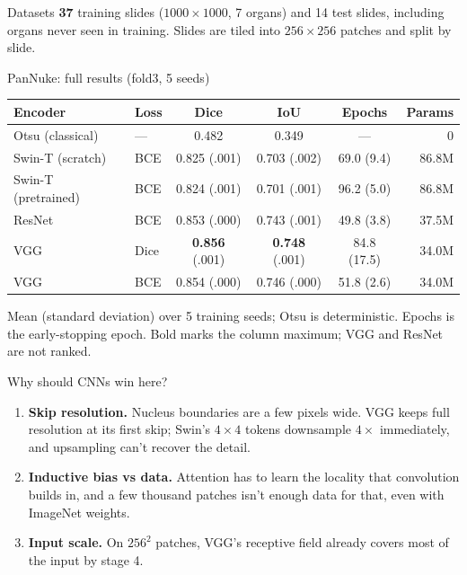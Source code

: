\documentclass[final]{beamer}
\newlength{\colwidth}
\begin{document}
\begin{frame}[t]
\begin{columns}[t]
\begin{column}{\colwidth}
\begin{block}{Datasets}
    \textbf{37} training slides ($1000\times1000$, 7 organs) and 14 test slides,
    including organs never seen in training. Slides are tiled into $256\times256$
    patches and split by slide.
  \end{block}

  \begin{block}{PanNuke: full results (fold3, 5 seeds)}
    \begin{center}
    \begin{tabular}{@{}llcccr@{}}
      \toprule
      \textbf{Encoder} & \textbf{Loss} & \textbf{Dice} & \textbf{IoU} & \textbf{Epochs} & \textbf{Params} \\
      \midrule
      Otsu (classical) & --- & 0.482 & 0.349 & --- & 0 \\
      \midrule
      Swin-T (scratch) & BCE & 0.825 {\small(.001)} & 0.703 {\small(.002)} & 69.0 {\small(9.4)} & 86.8M \\
      Swin-T (pretrained) & BCE & 0.824 {\small(.001)} & 0.701 {\small(.001)} & 96.2 {\small(5.0)} & 86.8M \\
      ResNet & BCE & 0.853 {\small(.000)} & 0.743 {\small(.001)} & 49.8 {\small(3.8)} & 37.5M \\
      VGG & Dice & \textbf{0.856} {\small(.001)} & \textbf{0.748} {\small(.001)} & 84.8 {\small(17.5)} & 34.0M \\
      VGG & BCE & 0.854 {\small(.000)} & 0.746 {\small(.000)} & 51.8 {\small(2.6)} & 34.0M \\
      \bottomrule
    \end{tabular}
    \end{center}
    Mean (standard deviation) over 5 training seeds; Otsu is deterministic. Epochs is the
    early-stopping epoch. Bold marks the column maximum; VGG and ResNet are not ranked.
  \end{block}

  \begin{block}{Why should CNNs win here?}
    \begin{enumerate}
      \item \textbf{Skip resolution.} Nucleus boundaries are a few pixels wide. VGG keeps
        full resolution at its first skip; Swin's $4\times4$ tokens downsample $4\times$
        immediately, and upsampling can't recover the detail.
      \item \textbf{Inductive bias vs data.} Attention has to learn the locality that
        convolution builds in, and a few thousand patches isn't enough data for that,
        even with ImageNet weights.
      \item \textbf{Input scale.} On $256^2$ patches, VGG's receptive field already
        covers most of the input by stage 4.
    \end{enumerate}
  \end{block}


\end{column}
\end{columns}
\end{frame}
\end{document}
